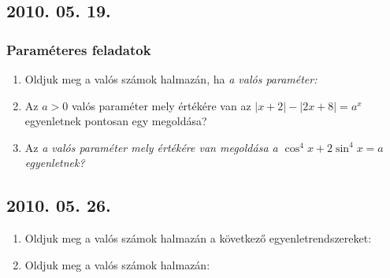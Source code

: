 \subsection*{2010. 05. 19.}
\subsubsection*{Paraméteres feladatok}
\begin{enumerate}

\item Oldjuk meg a valós számok halmazán, ha \it a \rm valós paraméter:

\item Az $a > 0$ valós paraméter mely értékére van az $|x+2|-|2x+8| = a^x$ egyenletnek pontosan egy megoldása?

\item Az \it a \rm valós paraméter mely értékére van megoldása a $\cos^4{x} + 2\sin^4{x} = a$ egyenletnek?

\end{enumerate}
\subsection*{2010. 05. 26.}

\begin{enumerate}

\item Oldjuk meg a valós számok halmazán a következő egyenletrendszereket:

\item Oldjuk meg a valós számok halmazán: 

\end{enumerate}
